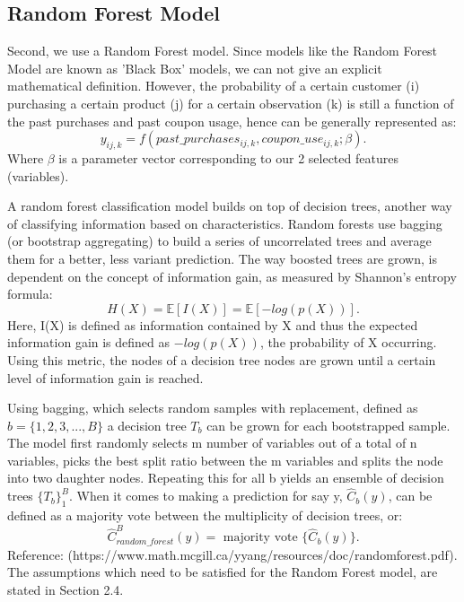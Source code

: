 \subsection{Random Forest Model}
Second, we use a Random Forest model. Since models like the Random Forest Model
are known as 'Black Box' models, we can not give an explicit mathematical
definition. However, the probability of a certain customer (i) purchasing a certain
product (j) for a certain observation (k) is still a function of the past
purchases and past coupon usage, hence can be generally represented as:
\begin{equation}
    y_{ij,k} = f(past\_purchases_{ij,k}, coupon\_use_{ij,k}; \beta).
\end{equation} Where $\beta$ is a parameter vector corresponding to our 2
selected features (variables).

A random forest classification model builds on top of decision trees, another way of 
classifying information based on characteristics. Random forests use bagging (or bootstrap aggregating) 
to build a series of uncorrelated trees and average them for a better, less variant prediction. 
The way boosted trees are grown, is dependent on the concept of information gain, 
as measured by Shannon’s entropy formula:
\begin{equation}
    H(X) = \mathbb{E}\left[ I(X) \right] = \mathbb{E}\left[ -log(p(X)) \right].
\end{equation}
Here, I(X) is defined as information contained by X and thus the expected information gain 
is defined as $-log(p(X))$, the probability of X occurring. Using this metric, the nodes of a 
decision tree nodes are grown until a certain level of information gain is reached.

Using bagging, which selects random samples with replacement, defined as $b =
\{1, 2, 3, ..., B\}$ a decision tree $T_{b}$ can be grown for each bootstrapped
sample. The model first randomly selects m number of variables out of a total of
n variables, picks the best split ratio between the m variables and splits the
node into two daughter nodes. Repeating this for all b yields an ensemble of
decision trees $\{T_{b}\}^{B}_{1}$. When it comes to making a prediction for say
y, $\hat{C}_{b}(y)$, can be defined as a majority vote between the multiplicity of decision
trees, or:
\begin{equation}
    \hat{C}_{random\_forest}^{B}(y) = \text{ majority vote }
\{\hat{C}_{b}(y)\}.
\end{equation}
Reference: (https://www.math.mcgill.ca/yyang/resources/doc/randomforest.pdf). \\
The assumptions which need to be satisfied for the Random Forest model, are
stated in Section 2.4.

